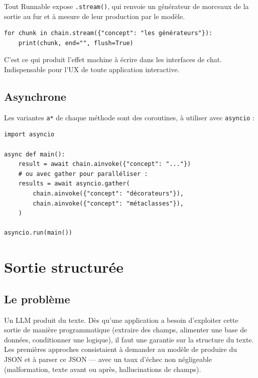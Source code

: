 \documentclass[11pt,a4paper]{article}
\begin{document}
Tout Runnable expose \texttt{.stream()}, qui renvoie un générateur de morceaux de la sortie au fur et à mesure de leur production par le modèle.

\begin{verbatim}
for chunk in chain.stream({"concept": "les générateurs"}):
    print(chunk, end="", flush=True)
\end{verbatim}

C'est ce qui produit l'effet \og machine à écrire \fg{} dans les interfaces de chat. Indispensable pour l'UX de toute application interactive.

\subsection{Asynchrone}

Les variantes \texttt{a*} de chaque méthode sont des coroutines, à utiliser avec \texttt{asyncio} :

\begin{verbatim}
import asyncio

async def main():
    result = await chain.ainvoke({"concept": "..."})
    # ou avec gather pour paralléliser :
    results = await asyncio.gather(
        chain.ainvoke({"concept": "décorateurs"}),
        chain.ainvoke({"concept": "métaclasses"}),
    )

asyncio.run(main())
\end{verbatim}

\section{Sortie structurée}

\subsection{Le problème}

Un LLM produit du texte. Dès qu'une application a besoin d'exploiter cette sortie de manière programmatique (extraire des champs, alimenter une base de données, conditionner une logique), il faut une garantie sur la structure du texte. Les premières approches consistaient à demander au modèle de produire du JSON et à parser ce JSON --- avec un taux d'échec non négligeable (malformation, texte avant ou après, hallucinations de champs).
\end{document}
